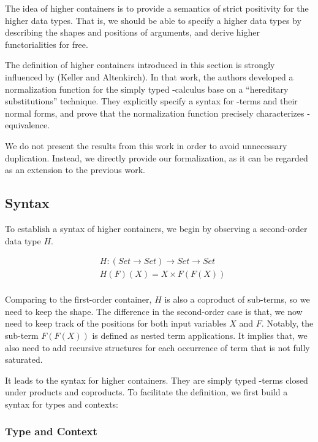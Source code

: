 The idea of higher containers is to provide a semantics of strict positivity for the higher data types. That is, we should be able to specify a higher data types by describing the shapes and positions of arguments, and derive higher functorialities for free. 

The definition of higher containers introduced in this section is strongly influenced by (Keller and Altenkirch)\cite{keller2010normalization}. In that work, the authors developed a normalization function for the simply typed \lambda-calculus base on a ``hereditary substitutions'' technique. They explicitly specify a syntax for \lambda-terms and their normal forms, and prove that the normalization function precisely characterizes \beta\eta-equivalence.

We do not present the results from this work in order to avoid unnecessary duplication. Instead, we directly provide our formalization, as it can be regarded as an extension to the previous work.

\subsection{Syntax}

To establish a syntax of higher containers, we begin by observing a second-order data type $H$.

\begin{align*}
& H : (Set \to Set) \to Set \to Set \\
& H (F) (X) = X \times F (F (X)) \\
\end{align*}

Comparing to the first-order container, $H$ is also a coproduct of sub-terms, so we need to keep the shape. The difference in the second-order case is that, we now need to keep track of the positions for both input variables $X$ and $F$. Notably, the sub-term $F(F(X))$ is defined as nested term applications. It implies that, we also need to add recursive structures for each occurrence of term that is not fully saturated.

It leads to the syntax for higher containers. They are simply typed \lambda-terms closed under products and coproducts. To facilitate the definition, we first build a syntax for types and contexts:

\subsubsection*{Type and Context}

